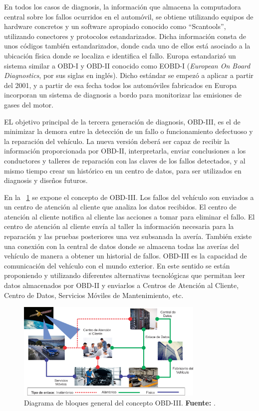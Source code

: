 En todos los casos de diagnosis, la información que almacena la computadora central sobre los fallos ocurridos en el automóvil, se obtiene utilizando equipos de hardware concretos y un software apropiado conocido como “Scantools”, utilizando conectores y protocolos estandarizados.
Dicha información consta de unos códigos también estandarizados, donde cada uno de ellos está asociado a la ubicación física donde se localiza e identifica el fallo.
Europa estandarizó un sistema similar a OBD-I y OBD-II conocido como EOBD-I (\textit{European On Board Diagnostics}, por sus siglas en inglés).
Dicho estándar se empezó a aplicar a partir del 2001, y a partir de esa fecha todos los automóviles fabricados en Europa incorporan un sistema de diagnosis a bordo para monitorizar las emisiones de gases del motor.

EL objetivo principal de la tercera generación de diagnosis,  OBD-III,  es el de minimizar la demora entre la detección de un fallo o funcionamiento defectuoso y la reparación del vehículo. 
La nueva versión deberá ser capaz de recibir la información proporcionada por OBD-II, interpretarla, enviar conclusiones a los conductores y talleres de reparación con las claves de los fallos detectados, y al mismo tiempo crear un histórico en un centro de datos, para ser utilizados en diagnosis y diseños futuros.


En la  \Figura~\ref{DenB} se expone el concepto de OBD-III. 
Los fallos del vehículo son enviados  a un centro de atención al cliente que analiza los datos recibidos. 
El centro de atención al cliente notifica al cliente las acciones a tomar para eliminar el fallo. 
El centro de atención al cliente envía al taller la información necesaria para la reparación  y las pruebas posteriores una vez subsanada la avería. 
También existe una conexión con la central de datos donde se almacena todas las averías del vehículo de manera a obtener un historial de fallos.
OBD-III es la capacidad de comunicación del vehículo con el mundo exterior. 
En este sentido se están proponiendo y utilizando diferentes alternativas tecnológicas que permitan leer datos almacenados por OBD-II y enviarlos a Centros de Atención al Cliente, Centro de Datos, Servicios Móviles de Mantenimiento, etc.

\begin{figure}[H]
	\centering
		\includegraphics[width=0.8\textwidth]{./Cap2imagen/J_concepto_OBDIII.png}
	\caption[Diagrama de bloques general del concepto OBD-III.]{Diagrama de bloques general del concepto OBD-III.\textbf{ Fuente:} \cite{DE}.}
	\label{DenB} %
\end{figure}


